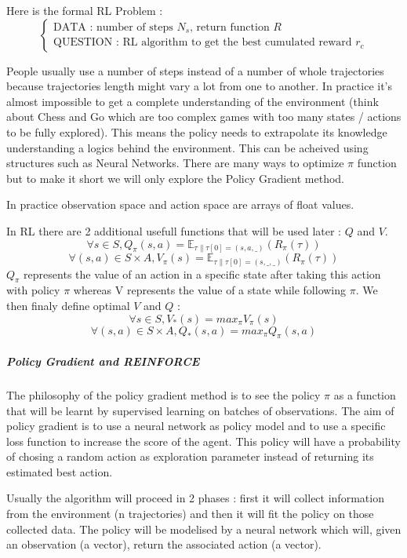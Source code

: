 \documentclass[11pt]{article}
\begin{document}
Here is the formal RL Problem : 
\begin{equation*}
\begin{cases}
\mbox{DATA : number of steps $N_s$, return function $R$}\\
\mbox{QUESTION : RL algorithm to get the best cumulated reward $r_c$}
\end{cases}
\end{equation*}

People usually use a number of steps instead of a number of whole trajectories because trajectories length might vary a lot from one to another.
In practice it's almost impossible to get a complete understanding of the environment (think about Chess and Go which are too complex games with too many states / actions to be fully explored). This means the policy needs to extrapolate its knowledge understanding a logics behind the environment. This can be acheived using structures such as Neural Networks. There are many ways to optimize $\pi$ function but to make it short we will only explore the Policy Gradient method.

In practice observation space and action space are arrays of float values.

In RL there are 2 additional usefull functions that will be used later : $Q$ and $V$. 
$$\forall s\in S, Q_\pi(s,a)=\mathbb{E}_{\tau\|\tau[0]=(s,a,\_)}(R_\pi(\tau)) $$
$$\forall (s,a)\in S\times A, V_\pi(s)=\mathbb{E}_{\tau\|\tau[0]=(s,\_,\_)}(R_\pi(\tau)) $$
$Q_\pi$ represents the value of an action in a specific state after taking this action with policy $\pi$ whereas V represents the value of a state while following $\pi$. We then finaly define optimal $V$ and $Q$ :
$$\forall s\in S,V_*(s) = max_\pi V_\pi(s)$$
$$\forall (s,a)\in S\times A,Q_*(s,a) = max_\pi Q_\pi(s,a)$$

\subparagraph{Policy Gradient and REINFORCE}
The philosophy of the policy gradient method is to see the policy $\pi$ as a function that will be learnt by supervised learning on batches of observations.  The aim of policy gradient is to use a neural network as policy model and to use a specific loss function to increase the score of the agent. This policy will have a probability of chosing a random action as exploration parameter instead of returning its estimated best action.

Usually the algorithm will proceed in 2 phases : first it will collect information from the environment (n trajectories) and then it will fit the policy on those collected data. The policy will be modelised by a neural network which will, given an observation (a vector), return the associated action (a vector).
\end{document}

